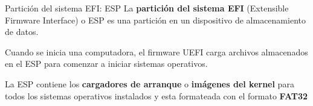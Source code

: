 \begin{frame}[c]{Partición del sistema EFI: ESP}
  La \textbf{partición del sistema EFI} (Extensible Firmware Interface) o ESP
  es una partición en un dispositivo de almacenamiento de datos.

  \vspace{\baselineskip}
  Cuando se inicia una computadora, el firmware UEFI carga archivos
  almacenados en el ESP para comenzar a iniciar sistemas operativos.

  \begin{center}
  \end{center}

  La ESP contiene los \textbf{cargadores de arranque} o \textbf{imágenes del
  kernel} para todos los sistemas operativos instalados y esta
  formateada con el formato \textbf{FAT32}
\end{frame}


